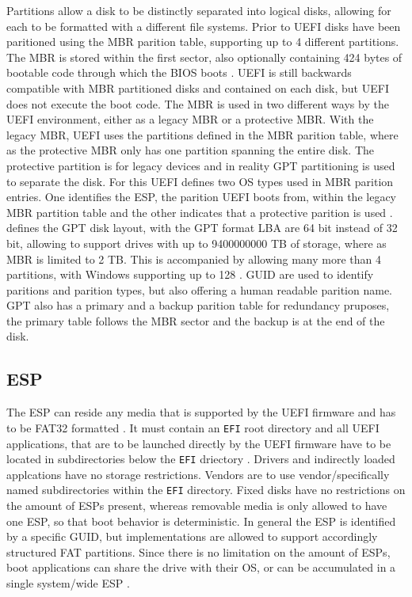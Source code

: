 Partitions allow a disk to be distinctly separated into logical disks, allowing for each to be formatted with a different file systems.
Prior to \ac{UEFI} disks have been paritioned using the \ac{MBR} parition table, supporting up to 4 different partitions.
The \ac{MBR} is stored within the first sector, also optionally containing 424 bytes of bootable code through which the \ac{BIOS} boots \cite[13.3.1]{uefi-spec}.
\ac{UEFI} is still backwards compatible with \ac{MBR} partitioned disks and contained on each disk, but \ac{UEFI} does not execute the boot code.
The \ac{MBR} is used in two different ways by the \ac{UEFI} environment, either as a legacy \ac{MBR} or a protective \ac{MBR}.
With the legacy \ac{MBR}, \ac{UEFI} uses the partitions defined in the \ac{MBR} parition table, where as the protective \ac{MBR} only has one partition spanning the entire disk.
The protective partition is for legacy devices and in reality \ac{GPT} partitioning is used to separate the disk.
For this \ac{UEFI} defines two \ac{OS} types used in \ac{MBR} parition entries.
One identifies the \ac{ESP}, the parition \ac{UEFI} boots from, within the legacy \ac{MBR} partition table and the other indicates that a protective parition is used \cite[5]{uefi-spec}.
\cite[5]{uefi-spec} defines the \ac{GPT} disk layout, with the \ac{GPT} format \ac{LBA} are 64 bit instead of 32 bit, allowing to support drives with up to 9400000000 \ac{TB} of storage, where as \ac{MBR} is limited to 2 \ac{TB}.
This is accompanied by allowing many more than 4 partitions, with Windows supporting up to 128 \cite{microsoft-windows-and-gpt-faq}.
\ac{GUID} are used to identify paritions and parition types, but also offering a human readable parition name.
\ac{GPT} also has a primary and a backup parition table for redundancy pruposes, the primary table follows the \ac{MBR} sector and the backup is at the end of the disk.

\subsection{\acf{ESP}}

The \ac{ESP} can reside any media that is supported by the \ac{UEFI} firmware and has to be \ac{FAT}32 formatted \cite[13.3]{uefi-spec}.
It must contain an \lstinline{EFI} root directory \cite[13.3.1.3]{uefi-spec} and all \ac{UEFI} applications, that are to be launched directly by the \ac{UEFI} firmware have to be located in subdirectories below the \lstinline{EFI} driectory \cite[13.3.1.3]{uefi-spec}. Drivers and indirectly loaded applcations have no storage restrictions. Vendors are to use vendor\-/specifically named subdirectories within the \lstinline{EFI} directory. Fixed disks have no restrictions on the amount of \acp{ESP} present, whereas removable media is only allowed to have one \ac{ESP}, so that boot behavior is deterministic. In general the \ac{ESP} is identified by a specific \ac{GUID}, but implementations are allowed to support accordingly structured \ac{FAT} partitions. Since there is no limitation on the amount of \acp{ESP}, boot applications can share the drive with their \ac{OS}, or can be accumulated in a single system\-/wide \ac{ESP} \cite[13.3.3]{uefi-spec}.


